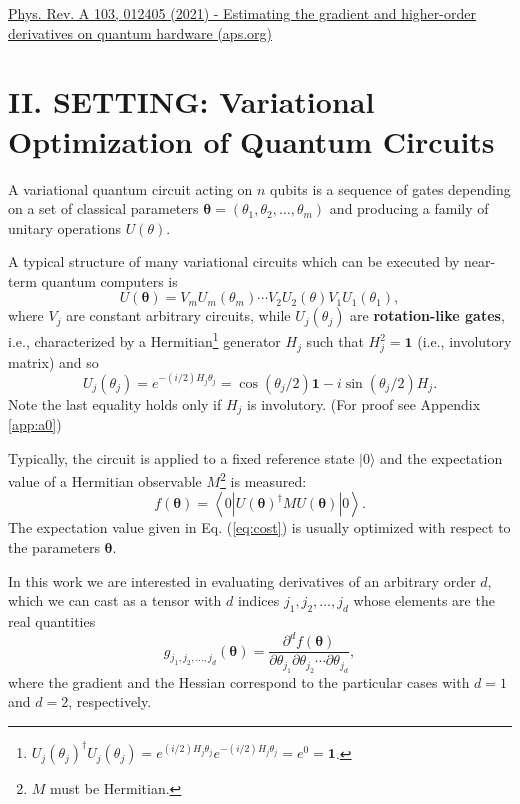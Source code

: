 \href{https://journals.aps.org/pra/abstract/10.1103/PhysRevA.103.012405}{Phys. Rev. A 103, 012405 (2021) - Estimating the gradient and higher-order derivatives on quantum hardware (aps.org)}  \cite{mari2021estimating}

\section{II. SETTING: Variational Optimization of Quantum Circuits}

A variational quantum circuit acting on $n$ qubits is a sequence of gates depending on a set of classical parameters $\boldsymbol{\theta}=\left(\theta_1, \theta_2, \ldots, \theta_m\right)$ and producing a family of unitary operations $U(\theta)$. 

A typical structure of many variational circuits which can be executed by near-term quantum computers is
\begin{equation}
    U(\boldsymbol{\theta})=V_m U_m\left(\theta_m\right) \cdots V_2 U_2(\theta) V_1 U_1\left(\theta_1\right),
\end{equation}
where $V_j$ are constant arbitrary circuits, while $U_j\left(\theta_j\right)$ are \textbf{rotation-like gates}, i.e., characterized by a Hermitian\footnote{$U_j\left(\theta_j\right)^{\dagger} U_j\left(\theta_j\right)=e^{(i / 2) H_j \theta_j} e^{-(i / 2) H_j \theta_j}=e^0=\mathbf{1}$.} generator $H_j$ such that $H_j^2=\textbf{1}$ (i.e., involutory matrix) and so
\begin{equation}
    U_j\left(\theta_j\right)=e^{-(i / 2) H_j \theta_j}=\cos \left(\theta_j / 2\right) \textbf{1}-i \sin \left(\theta_j / 2\right) H_j .
\end{equation}
Note the last equality holds only if $H_j$ is involutory. (For proof see Appendix \ref{app:a0})

Typically, the circuit is applied to a fixed reference state $|0\rangle$ and the expectation value of a Hermitian observable $M$\footnote{$M$ must be Hermitian.} is measured:
\begin{equation}\label{eq:cost}
    f(\boldsymbol{\theta})=\left\langle 0\left|U(\boldsymbol{\theta})^{\dagger} M U(\boldsymbol{\theta})\right| 0\right\rangle .
\end{equation}
The expectation value given in Eq. (\ref{eq:cost}) is usually optimized with respect to the parameters $\boldsymbol{\theta}$. 

In this work we are interested in evaluating derivatives of an arbitrary order $d$, which we can cast as a tensor with $d$ indices $j_1, j_2, \ldots, j_d$ whose elements are the real quantities
\begin{equation}\label{eq:deribatives}
    g_{j_1, j_2, \ldots, j_d}(\boldsymbol{\theta})=\frac{\partial^d f(\boldsymbol{\theta})}{\partial \theta_{j_1} \partial \theta_{j_2} \cdots \partial \theta_{j_d}},
\end{equation}
where the gradient and the Hessian correspond to the particular cases with $d=1$ and $d=2$, respectively. 

